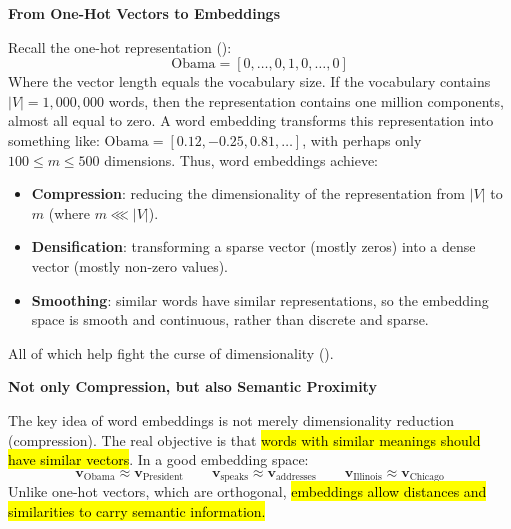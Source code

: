 \highspace
\begin{flushleft}
    \textcolor{Green3}{ \textbf{From One-Hot Vectors to Embeddings}}
\end{flushleft}
Recall the one-hot representation ():
\begin{equation*}
    \text{Obama} = \left[0, \dots, 0, 1, 0, \dots, 0\right]
\end{equation*}
Where the vector length equals the vocabulary size. If the vocabulary contains $\left|V\right| = 1,000,000$ words, then the representation contains one million components, almost all equal to zero. A word embedding transforms this representation into something like: $\text{Obama} = \left[0.12, -0.25, 0.81, \dots\right]$, with perhaps only $100 \le m \le 500$ dimensions. Thus, word embeddings achieve:
\begin{itemize}
    \item[\textcolor{Green3}{\faIcon{check}}] \textcolor{Green3}{\textbf{Compression}}: reducing the dimensionality of the representation from $\left|V\right|$ to $m$ (where $m \lll \left|V\right|$).
    \item[\textcolor{Green3}{\faIcon{check}}] \textcolor{Green3}{\textbf{Densification}}: transforming a sparse vector (mostly zeros) into a dense vector (mostly non-zero values).
    \item[\textcolor{Green3}{\faIcon{check}}] \textcolor{Green3}{\textbf{Smoothing}}: similar words have similar representations, so the embedding space is smooth and continuous, rather than discrete and sparse.
\end{itemize}
All of which help fight the curse of dimensionality ().

\highspace
\begin{flushleft}
    \textcolor{Green3}{ \textbf{Not only Compression, but also Semantic Proximity}}
\end{flushleft}
The key idea of word embeddings is not merely dimensionality reduction (compression). The real objective is that \hl{words with similar meanings should have similar vectors}. In a good embedding space:
\begin{equation*}
    \mathbf{v}_{\text{Obama}} \approx \mathbf{v}_{\text{President}} \qquad
    \mathbf{v}_{\text{speaks}} \approx \mathbf{v}_{\text{addresses}} \qquad
    \mathbf{v}_{\text{Illinois}} \approx \mathbf{v}_{\text{Chicago}}
\end{equation*}
Unlike one-hot vectors, which are orthogonal, \hl{embeddings allow distances and similarities to carry semantic information.}

